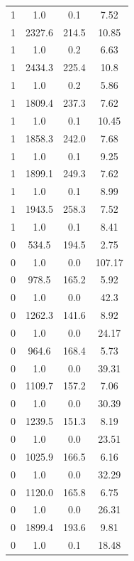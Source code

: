 \begin{table}[htbp]
\begin{tabular}{c c c c}
1 & 1.0 & 0.1 & 7.52 \\
1 & 2327.6 & 214.5 & 10.85 \\
1 & 1.0 & 0.2 & 6.63 \\
1 & 2434.3 & 225.4 & 10.8 \\
1 & 1.0 & 0.2 & 5.86 \\
1 & 1809.4 & 237.3 & 7.62 \\
1 & 1.0 & 0.1 & 10.45 \\
1 & 1858.3 & 242.0 & 7.68 \\
1 & 1.0 & 0.1 & 9.25 \\
1 & 1899.1 & 249.3 & 7.62 \\
1 & 1.0 & 0.1 & 8.99 \\
1 & 1943.5 & 258.3 & 7.52 \\
1 & 1.0 & 0.1 & 8.41 \\
0 & 534.5 & 194.5 & 2.75 \\
0 & 1.0 & 0.0 & 107.17 \\
0 & 978.5 & 165.2 & 5.92 \\
0 & 1.0 & 0.0 & 42.3 \\
0 & 1262.3 & 141.6 & 8.92 \\
0 & 1.0 & 0.0 & 24.17 \\
0 & 964.6 & 168.4 & 5.73 \\
0 & 1.0 & 0.0 & 39.31 \\
0 & 1109.7 & 157.2 & 7.06 \\
0 & 1.0 & 0.0 & 30.39 \\
0 & 1239.5 & 151.3 & 8.19 \\
0 & 1.0 & 0.0 & 23.51 \\
0 & 1025.9 & 166.5 & 6.16 \\
0 & 1.0 & 0.0 & 32.29 \\
0 & 1120.0 & 165.8 & 6.75 \\
0 & 1.0 & 0.0 & 26.31 \\
0 & 1899.4 & 193.6 & 9.81 \\
0 & 1.0 & 0.1 & 18.48 \\
\hline
\end{tabular}
\end{table}
